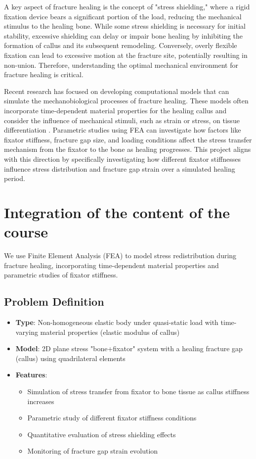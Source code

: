 \documentclass{article}
\begin{document}
A key aspect of fracture healing is the concept of "stress shielding," where a rigid fixation device bears a significant portion of the load, reducing the mechanical stimulus to the healing bone. While some stress shielding is necessary for initial stability, excessive shielding can delay or impair bone healing by inhibiting the formation of callus and its subsequent remodeling. Conversely, overly flexible fixation can lead to excessive motion at the fracture site, potentially resulting in non-union. Therefore, understanding the optimal mechanical environment for fracture healing is critical.

Recent research has focused on developing computational models that can simulate the mechanobiological processes of fracture healing. These models often incorporate time-dependent material properties for the healing callus and consider the influence of mechanical stimuli, such as strain or stress, on tissue differentiation \citep{morgan2024novel}. Parametric studies using FEA can investigate how factors like fixator stiffness, fracture gap size, and loading conditions affect the stress transfer mechanism from the fixator to the bone as healing progresses. This project aligns with this direction by specifically investigating how different fixator stiffnesses influence stress distribution and fracture gap strain over a simulated healing period.

\section{Integration of the content of the course}

We use Finite Element Analysis (FEA) to model stress redistribution during fracture healing, incorporating time-dependent material properties and parametric studies of fixator stiffness.

\subsection{Problem Definition}

\begin{itemize}
  \item \textbf{Type}: Non-homogeneous elastic body under quasi-static load with time-varying material properties (elastic modulus of callus)
  \item \textbf{Model}: 2D plane stress "bone+fixator" system with a healing fracture gap (callus) using quadrilateral elements
  \item \textbf{Features}:
        \begin{itemize}
          \item Simulation of stress transfer from fixator to bone tissue as callus stiffness increases
          \item Parametric study of different fixator stiffness conditions
          \item Quantitative evaluation of stress shielding effects
          \item Monitoring of fracture gap strain evolution
        \end{itemize}
\end{itemize}
\end{document}
